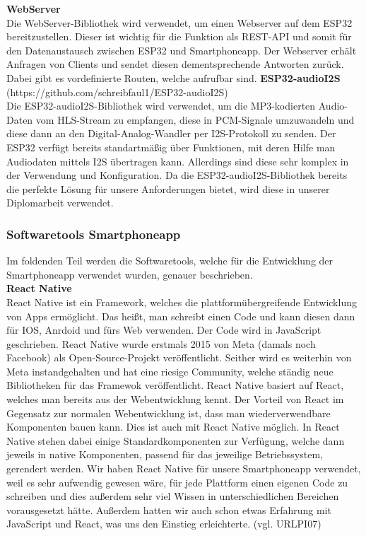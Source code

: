 \documentclass[]{article}
\begin{document}
\vspace{4mm}\newline
\textbf{WebServer} \\
Die WebServer-Bibliothek wird verwendet, um einen Webserver auf dem ESP32 bereitzustellen. Dieser ist wichtig für die Funktion als REST-API und somit für den Datenaustausch zwischen ESP32 und Smartphoneapp. Der Webserver erhält Anfragen von Clients und sendet diesen dementsprechende Antworten zurück. Dabei gibt es vordefinierte Routen, welche aufrufbar sind.
\vspace{4mm}\newline
\textbf{ESP32-audioI2S} \\
(https://github.com/schreibfaul1/ESP32-audioI2S) \\
Die ESP32-audioI2S-Bibliothek wird verwendet, um die MP3-kodierten Audio-Daten vom HLS-Stream zu empfangen, diese in PCM-Signale umzuwandeln und diese dann an den Digital-Analog-Wandler per I2S-Protokoll zu senden. Der ESP32 verfügt bereits standartmäßig über Funktionen, mit deren Hilfe man Audiodaten mittels I2S übertragen kann. Allerdings sind diese sehr komplex in der Verwendung und Konfiguration. Da die ESP32-audioI2S-Bibliothek bereits die perfekte Lösung für unsere Anforderungen bietet, wird diese in unserer Diplomarbeit verwendet.
\subsubsection{Softwaretools Smartphoneapp}
Im foldenden Teil werden die Softwaretools, welche für die Entwicklung der Smartphoneapp verwendet wurden, genauer beschrieben. \\

\textbf{React Native} \\
React Native ist ein Framework, welches die plattformübergreifende Entwicklung von Apps ermöglicht. Das heißt, man schreibt einen Code und kann diesen dann für IOS, Anrdoid und fürs Web verwenden. Der Code wird in JavaScript geschrieben. React Native wurde erstmals 2015 von Meta (damals noch Facebook) als Open-Source-Projekt veröffentlicht. Seither wird es weiterhin von Meta instandgehalten und hat eine riesige Community, welche ständig neue Bibliotheken für das Framewok veröffentlicht. React Native basiert auf React, welches man bereits aus der Webentwicklung kennt. Der Vorteil von React im Gegensatz zur normalen Webentwicklung ist, dass man wiederverwendbare Komponenten bauen kann. Dies ist auch mit React Native möglich. In React Native stehen dabei einige Standardkomponenten zur Verfügung, welche dann jeweils in native Komponenten, passend für das jeweilige Betriebssystem, gerendert werden. 
Wir haben React Native für unsere Smartphoneapp verwendet, weil es sehr aufwendig gewesen wäre, für jede Plattform einen eigenen Code zu schreiben und dies außerdem sehr viel Wissen in unterschiedlichen Bereichen vorausgesetzt hätte. Außerdem hatten wir auch schon etwas Erfahrung mit JavaScript und React, was uns den Einstieg erleichterte.
(vgl. URLPI07)
\end{document}
